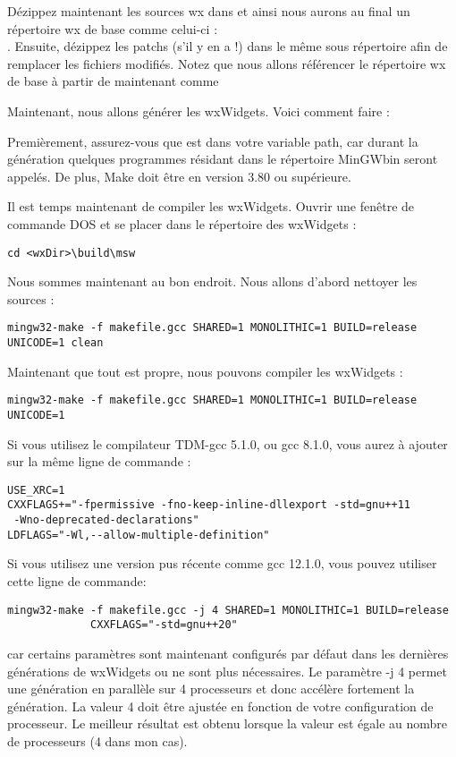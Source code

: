 Dézippez maintenant les sources wx dans  et ainsi nous aurons au final un répertoire wx de base comme celui-ci :\\
. Ensuite, dézippez les patchs (s'il y en a !) dans le même sous répertoire afin de remplacer les fichiers modifiés. Notez que nous allons référencer le répertoire wx de base à partir de maintenant comme 

Maintenant, nous allons générer les wxWidgets. Voici comment faire :

Premièrement, assurez-vous que  est dans votre variable path, car durant la génération quelques programmes résidant dans le répertoire MinGW\osp bin seront appelés. De plus, Make doit être en version 3.80 ou supérieure.

Il est temps maintenant de compiler les wxWidgets. Ouvrir une fenêtre de commande DOS et se placer dans le répertoire des wxWidgets :

\begin{verbatim}
cd <wxDir>\build\msw
\end{verbatim}

Nous sommes maintenant au bon endroit. Nous allons d'abord nettoyer les sources :

\begin{verbatim}
mingw32-make -f makefile.gcc SHARED=1 MONOLITHIC=1 BUILD=release UNICODE=1 clean
\end{verbatim}

Maintenant que tout est propre, nous pouvons compiler les wxWidgets :

\begin{verbatim}
mingw32-make -f makefile.gcc SHARED=1 MONOLITHIC=1 BUILD=release UNICODE=1
\end{verbatim}

Si vous utilisez le compilateur TDM-gcc 5.1.0, ou gcc 8.1.0, vous aurez à ajouter sur la même ligne de commande : 
\begin{verbatim}
USE_XRC=1
CXXFLAGS+="-fpermissive -fno-keep-inline-dllexport -std=gnu++11
 -Wno-deprecated-declarations"
LDFLAGS="-Wl,--allow-multiple-definition"
\end{verbatim}  

Si vous utilisez une version pus récente comme gcc 12.1.0, vous pouvez utiliser cette ligne de commande:
\begin{verbatim}
mingw32-make -f makefile.gcc -j 4 SHARED=1 MONOLITHIC=1 BUILD=release
             CXXFLAGS="-std=gnu++20"
\end{verbatim}
car certains paramètres sont maintenant configurés par défaut dans les dernières générations de wxWidgets ou ne sont plus nécessaires.\newline
Le paramètre -j 4 permet une génération en parallèle sur 4 processeurs et donc accélère fortement la génération. La valeur 4 doit être ajustée en fonction de votre configuration de processeur.
Le meilleur résultat est obtenu lorsque la valeur est égale au nombre de processeurs (4 dans mon cas).

